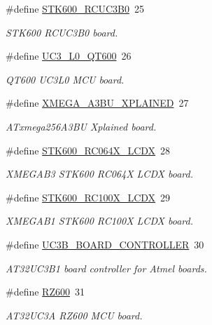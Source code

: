 \begin{DoxyCompactItemize}
\#define \hyperlink{group__group__common__boards_ga6bdfe50597188fd8a4956c247ecf9fa9}{S\-T\-K600\-\_\-\-R\-C\-U\-C3\-B0}~25
\begin{DoxyCompactList}\small\item\em S\-T\-K600 R\-C\-U\-C3\-B0 board. \end{DoxyCompactList}\item 
\#define \hyperlink{group__group__common__boards_gae06980d7c2c8a89eab699394bfb52897}{U\-C3\-\_\-\-L0\-\_\-\-Q\-T600}~26
\begin{DoxyCompactList}\small\item\em Q\-T600 U\-C3\-L0 M\-C\-U board. \end{DoxyCompactList}\item 
\#define \hyperlink{group__group__common__boards_ga6bc10dae84bde15597ba87e803e6f476}{X\-M\-E\-G\-A\-\_\-\-A3\-B\-U\-\_\-\-X\-P\-L\-A\-I\-N\-E\-D}~27
\begin{DoxyCompactList}\small\item\em A\-Txmega256\-A3\-B\-U Xplained board. \end{DoxyCompactList}\item 
\#define \hyperlink{group__group__common__boards_gae7749288a3bd2be20b0283233af4df79}{S\-T\-K600\-\_\-\-R\-C064\-X\-\_\-\-L\-C\-D\-X}~28
\begin{DoxyCompactList}\small\item\em X\-M\-E\-G\-A\-B3 S\-T\-K600 R\-C064\-X L\-C\-D\-X board. \end{DoxyCompactList}\item 
\#define \hyperlink{group__group__common__boards_gab6b4267fd4d74fbb8cf083764addfdc8}{S\-T\-K600\-\_\-\-R\-C100\-X\-\_\-\-L\-C\-D\-X}~29
\begin{DoxyCompactList}\small\item\em X\-M\-E\-G\-A\-B1 S\-T\-K600 R\-C100\-X L\-C\-D\-X board. \end{DoxyCompactList}\item 
\#define \hyperlink{group__group__common__boards_ga79a559c8d51d9370af4f37c36b6e7d58}{U\-C3\-B\-\_\-\-B\-O\-A\-R\-D\-\_\-\-C\-O\-N\-T\-R\-O\-L\-L\-E\-R}~30
\begin{DoxyCompactList}\small\item\em A\-T32\-U\-C3\-B1 board controller for Atmel boards. \end{DoxyCompactList}\item 
\#define \hyperlink{group__group__common__boards_ga4c22f34cf2ee08f07ce959d9a3009d85}{R\-Z600}~31
\begin{DoxyCompactList}\small\item\em A\-T32\-U\-C3\-A R\-Z600 M\-C\-U board. \end{DoxyCompactList}\item 

\end{DoxyCompactItemize}

